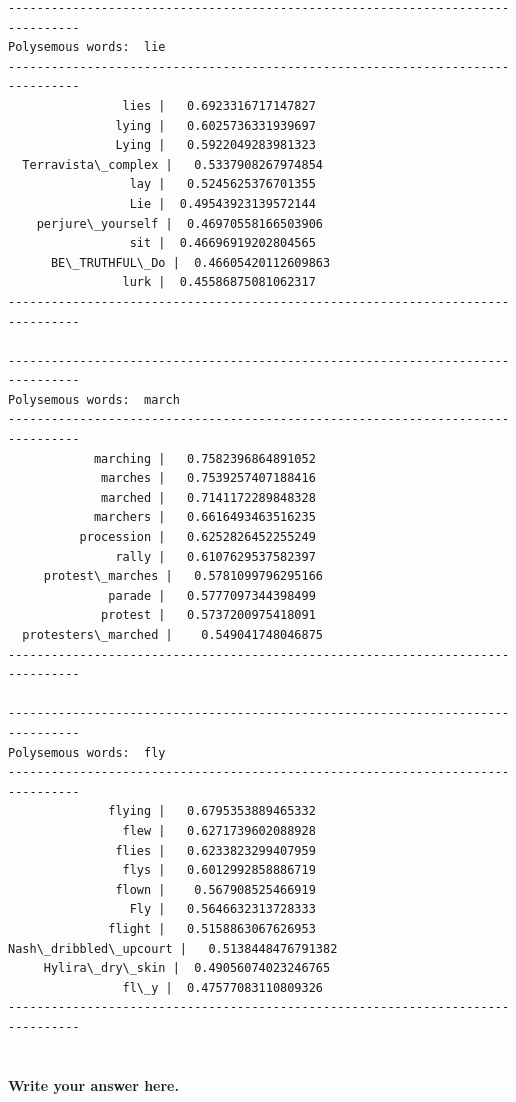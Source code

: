 \documentclass[11pt]{article}
\begin{document}
    \begin{Verbatim}[commandchars=\\\{\},fontsize=\footnotesize]
--------------------------------------------------------------------------------
Polysemous words:  lie
--------------------------------------------------------------------------------
                lies |   0.6923316717147827
               lying |   0.6025736331939697
               Lying |   0.5922049283981323
  Terravista\_complex |   0.5337908267974854
                 lay |   0.5245625376701355
                 Lie |  0.49543923139572144
    perjure\_yourself |  0.46970558166503906
                 sit |  0.46696919202804565
      BE\_TRUTHFUL\_Do |  0.46605420112609863
                lurk |  0.45586875081062317
--------------------------------------------------------------------------------

--------------------------------------------------------------------------------
Polysemous words:  march
--------------------------------------------------------------------------------
            marching |   0.7582396864891052
             marches |   0.7539257407188416
             marched |   0.7141172289848328
            marchers |   0.6616493463516235
          procession |   0.6252826452255249
               rally |   0.6107629537582397
     protest\_marches |   0.5781099796295166
              parade |   0.5777097344398499
             protest |   0.5737200975418091
  protesters\_marched |    0.549041748046875
--------------------------------------------------------------------------------

--------------------------------------------------------------------------------
Polysemous words:  fly
--------------------------------------------------------------------------------
              flying |   0.6795353889465332
                flew |   0.6271739602088928
               flies |   0.6233823299407959
                flys |   0.6012992858886719
               flown |    0.567908525466919
                 Fly |   0.5646632313728333
              flight |   0.5158863067626953
Nash\_dribbled\_upcourt |   0.5138448476791382
     Hylira\_dry\_skin |  0.49056074023246765
                fl\_y |  0.47577083110809326
--------------------------------------------------------------------------------


    \end{Verbatim}

    \paragraph{Write your answer here.}\label{write-your-answer-here.}
\end{document}
